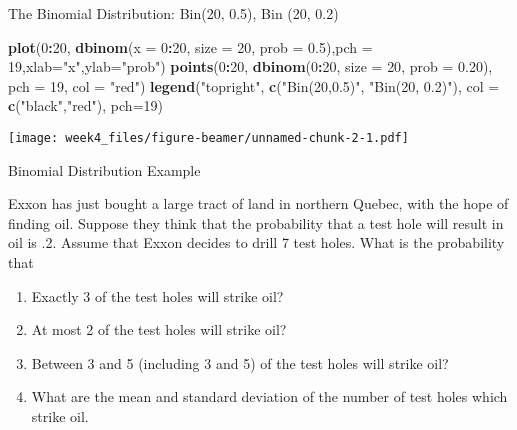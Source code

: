\documentclass[12pt,ignorenonframetext,compress]{beamer}
\newenvironment{Shaded}{\begin{snugshade}}{\end{snugshade}}
\newcommand{\KeywordTok}[1]{\textcolor[rgb]{0.13,0.29,0.53}{\textbf{#1}}}
\newcommand{\DataTypeTok}[1]{\textcolor[rgb]{0.13,0.29,0.53}{#1}}
\newcommand{\DecValTok}[1]{\textcolor[rgb]{0.00,0.00,0.81}{#1}}
\newcommand{\FloatTok}[1]{\textcolor[rgb]{0.00,0.00,0.81}{#1}}
\newcommand{\StringTok}[1]{\textcolor[rgb]{0.31,0.60,0.02}{#1}}
\newcommand{\OperatorTok}[1]{\textcolor[rgb]{0.81,0.36,0.00}{\textbf{#1}}}
\newcommand{\NormalTok}[1]{#1}
\let\oldShaded\Shaded
\let\endoldShaded\endShaded
\renewenvironment{Shaded}{\scriptsize\oldShaded}{\endoldShaded}
\begin{document}
\begin{frame}[fragile]{The Binomial Distribution: Bin(20, 0.5), Bin (20,
0.2)}

\begin{Shaded}
\begin{Highlighting}[]
\KeywordTok{plot}\NormalTok{(}\DecValTok{0}\OperatorTok{:}\DecValTok{20}\NormalTok{, }\KeywordTok{dbinom}\NormalTok{(}\DataTypeTok{x =} \DecValTok{0}\OperatorTok{:}\DecValTok{20}\NormalTok{, }\DataTypeTok{size =} \DecValTok{20}\NormalTok{, }\DataTypeTok{prob =} \FloatTok{0.5}\NormalTok{),}\DataTypeTok{pch =} \DecValTok{19}\NormalTok{,}\DataTypeTok{xlab=}\StringTok{"x"}\NormalTok{,}\DataTypeTok{ylab=}\StringTok{"prob"}\NormalTok{)}
\KeywordTok{points}\NormalTok{(}\DecValTok{0}\OperatorTok{:}\DecValTok{20}\NormalTok{, }\KeywordTok{dbinom}\NormalTok{(}\DecValTok{0}\OperatorTok{:}\DecValTok{20}\NormalTok{, }\DataTypeTok{size =} \DecValTok{20}\NormalTok{, }\DataTypeTok{prob =} \FloatTok{0.20}\NormalTok{), }\DataTypeTok{pch =} \DecValTok{19}\NormalTok{, }\DataTypeTok{col =} \StringTok{"red"}\NormalTok{)}
\KeywordTok{legend}\NormalTok{(}\StringTok{"topright"}\NormalTok{, }\KeywordTok{c}\NormalTok{(}\StringTok{"Bin(20,0.5)"}\NormalTok{, }\StringTok{"Bin(20, 0.2)"}\NormalTok{), }\DataTypeTok{col =} \KeywordTok{c}\NormalTok{(}\StringTok{"black"}\NormalTok{,}\StringTok{"red"}\NormalTok{), }\DataTypeTok{pch=}\DecValTok{19}\NormalTok{)}
\end{Highlighting}
\end{Shaded}

\texttt{[image: week4\_files/figure-beamer/unnamed-chunk-2-1.pdf]}

\end{frame}

\begin{frame}{Binomial Distribution Example}

\begin{example}[Exxon]
Exxon has just bought a large tract of land in northern Quebec, with the hope of finding oil. Suppose they think that the probability that a test hole will result in oil is .2. Assume that Exxon decides to drill 7 test holes. What is the probability that
\begin{enumerate}
\item Exactly 3 of the test holes will strike oil?
\item At most 2 of the test holes will strike oil?
\item Between 3 and 5 (including 3 and 5) of the test holes will strike oil?
\item What are the mean and standard deviation of the number of test holes which strike oil.
\end{enumerate}
\end{example}

\end{frame}
\end{document}
